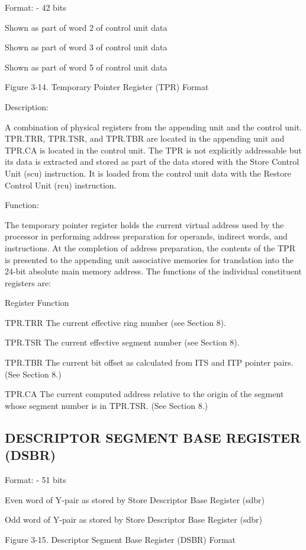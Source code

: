 Format: - 42 bits

Shown as part of word 2 of control unit data

Shown as part of word 3 of control unit data

Shown as part of word 5 of control unit data

Figure 3-14. Temporary Pointer Register (TPR) Format

Description:

A combination of physical registers from the appending unit and the control
unit. TPR.TRR, TPR.TSR, and TPR.TBR are located in the appending unit and
TPR.CA is located in the control unit. The TPR is not explicitly addressable
but its data is extracted and stored as part of the data stored with the Store
Control Unit (scu) instruction. It is loaded from the control unit data with
the Restore Control Unit (rcu) instruction.

Function:

The temporary pointer register holds the current virtual address used by the
processor in performing address preparation for operands, indirect words, and
instructions. At the completion of address preparation, the contents of the TPR
is presented to the appending unit associative memories for translation into
the 24-bit absolute main memory address.  The functions of the individual
constituent registers are:

Register Function

TPR.TRR The current effective ring number (see Section 8).

TPR.TSR The current effective segment number (see Section 8).

TPR.TBR The current bit offset as calculated from ITS and ITP pointer pairs.
(See Section 8.)

TPR.CA The current computed address relative to the origin of the segment whose
segment number is in TPR.TSR. (See Section 8.)

\subsection{DESCRIPTOR SEGMENT BASE REGISTER (DSBR)}

Format: - 51 bits

Even word of Y-pair as stored by Store Descriptor Base Register (sdbr)

Odd word of Y-pair as stored by Store Descriptor Base Register (sdbr)

Figure 3-15. Descriptor Segment Base Register (DSBR) Format

